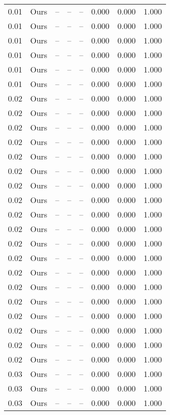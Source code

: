 \begin{table}[H]
\begin{tabular}{l c l l l}
0.01 & Ours & -- & -- & -- & 0.000 & 0.000 & 1.000 \\
0.01 & Ours & -- & -- & -- & 0.000 & 0.000 & 1.000 \\
0.01 & Ours & -- & -- & -- & 0.000 & 0.000 & 1.000 \\
0.01 & Ours & -- & -- & -- & 0.000 & 0.000 & 1.000 \\
0.01 & Ours & -- & -- & -- & 0.000 & 0.000 & 1.000 \\
0.01 & Ours & -- & -- & -- & 0.000 & 0.000 & 1.000 \\
0.02 & Ours & -- & -- & -- & 0.000 & 0.000 & 1.000 \\
0.02 & Ours & -- & -- & -- & 0.000 & 0.000 & 1.000 \\
0.02 & Ours & -- & -- & -- & 0.000 & 0.000 & 1.000 \\
0.02 & Ours & -- & -- & -- & 0.000 & 0.000 & 1.000 \\
0.02 & Ours & -- & -- & -- & 0.000 & 0.000 & 1.000 \\
0.02 & Ours & -- & -- & -- & 0.000 & 0.000 & 1.000 \\
0.02 & Ours & -- & -- & -- & 0.000 & 0.000 & 1.000 \\
0.02 & Ours & -- & -- & -- & 0.000 & 0.000 & 1.000 \\
0.02 & Ours & -- & -- & -- & 0.000 & 0.000 & 1.000 \\
0.02 & Ours & -- & -- & -- & 0.000 & 0.000 & 1.000 \\
0.02 & Ours & -- & -- & -- & 0.000 & 0.000 & 1.000 \\
0.02 & Ours & -- & -- & -- & 0.000 & 0.000 & 1.000 \\
0.02 & Ours & -- & -- & -- & 0.000 & 0.000 & 1.000 \\
0.02 & Ours & -- & -- & -- & 0.000 & 0.000 & 1.000 \\
0.02 & Ours & -- & -- & -- & 0.000 & 0.000 & 1.000 \\
0.02 & Ours & -- & -- & -- & 0.000 & 0.000 & 1.000 \\
0.02 & Ours & -- & -- & -- & 0.000 & 0.000 & 1.000 \\
0.02 & Ours & -- & -- & -- & 0.000 & 0.000 & 1.000 \\
0.02 & Ours & -- & -- & -- & 0.000 & 0.000 & 1.000 \\
0.03 & Ours & -- & -- & -- & 0.000 & 0.000 & 1.000 \\
0.03 & Ours & -- & -- & -- & 0.000 & 0.000 & 1.000 \\
0.03 & Ours & -- & -- & -- & 0.000 & 0.000 & 1.000 \\

\end{tabular}
\end{table}
